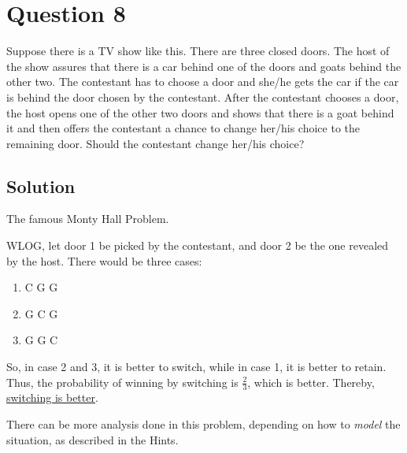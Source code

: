 \section*{Question 8}

Suppose there is a TV show like this. There are three closed doors.
The host of the show assures that there is a car behind one of the doors and goats behind the other two.
The contestant has to choose a door and she/he gets the car if the car is behind the door chosen by the contestant.
After the contestant chooses a door, the host opens one of the other two doors and shows that there is a goat behind it and then offers the contestant a chance to change her/his choice to the remaining door.
Should the contestant change her/his choice?

\subsection*{Solution}

The famous Monty Hall Problem.

WLOG, let door 1 be picked by the contestant, and door 2 be the one revealed by the host.
There would be three cases:
\begin{enumerate}[itemsep=-0.5em]
    \item C G G
    \item G C G
    \item G G C
\end{enumerate}
So, in case 2 and 3, it is better to switch, while in case 1, it is better to retain.
Thus, the probability of winning by switching is \( \frac{2}{3} \), which is better.
Thereby, \underline{switching is better}.

There can be more analysis done in this problem, depending on how to \textit{model} the situation, as described in the Hints.
